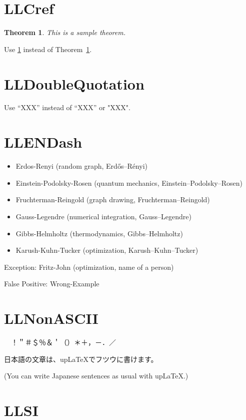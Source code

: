 \documentclass[a4paper, 10pt]{article}
\newtheorem{theorem}{Theorem}
\begin{document}
\section{LLCref}

\begin{theorem}
    \label{thm:sample}
    This is a sample theorem.
\end{theorem}

Use \cref{thm:sample} instead of Theorem~\ref{thm:sample}.

\section{LLDoubleQuotation}

Use ``XXX'' instead of “XXX” or "XXX".

\section{LLENDash}

\begin{itemize}
    \item Erdos-Renyi (random graph, Erd\H{o}s--R\'enyi)
    \item Einstein-Podolsky-Rosen (quantum mechanics, Einstein--Podolsky--Rosen)
    \item Fruchterman-Reingold (graph drawing, Fruchterman--Reingold)
    \item Gauss-Legendre (numerical integration, Gauss--Legendre)
    \item Gibbs-Helmholtz (thermodynamics, Gibbs--Helmholtz)
    \item Karush-Kuhn-Tucker (optimization, Karush--Kuhn--Tucker)
\end{itemize}

Exception: Fritz-John (optimization, name of a person)

False Positive: Wrong-Example

\section{LLNonASCII}

 {　}！＂＃＄％＆＇（）＊＋，－．／

日本語の文章は、upLaTeXでフツウに書けます。

(You can write Japanese sentences as usual with upLaTeX.)

\section{LLSI}
\end{document}

